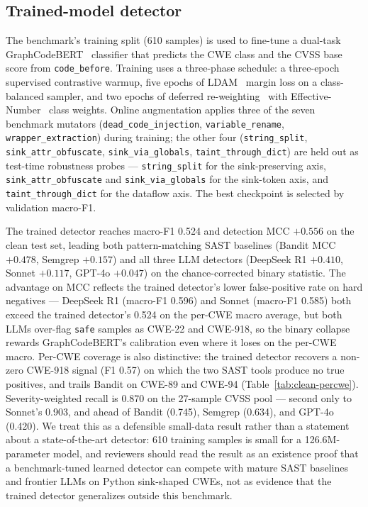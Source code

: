 \subsection{Trained-model detector}
\label{sec:eval:model}

The benchmark's training split (610 samples) is used to fine-tune a
dual-task GraphCodeBERT~\cite{graphcodebert} classifier that predicts
the CWE class and the CVSS base score from \texttt{code\_before}.
Training uses a three-phase schedule: a three-epoch supervised
contrastive warmup, five epochs of LDAM~\cite{cao2019ldam} margin
loss on a class-balanced sampler, and two epochs of deferred
re-weighting~\cite{cao2019ldam} with Effective-Number~\cite{cui2019cb}
class weights. Online augmentation applies three of the seven
benchmark mutators (\texttt{dead\_code\_injection},
\texttt{variable\_rename}, \texttt{wrapper\_extraction}) during
training; the other four (\texttt{string\_split},
\texttt{sink\_attr\_obfuscate}, \texttt{sink\_via\_globals},
\texttt{taint\_through\_dict}) are held out as test-time robustness
probes — \texttt{string\_split} for the sink-preserving axis,
\texttt{sink\_attr\_obfuscate} and \texttt{sink\_via\_globals} for
the sink-token axis, and \texttt{taint\_through\_dict} for the
dataflow axis. The best checkpoint is selected by validation
macro-F1.

The trained detector reaches macro-F1 0.524 and detection MCC
$+0.556$ on the clean test set, leading both pattern-matching SAST
baselines (Bandit MCC $+0.478$, Semgrep $+0.157$) and all three LLM
detectors (DeepSeek R1 $+0.410$, Sonnet $+0.117$, GPT-4o $+0.047$)
on the chance-corrected binary statistic. The advantage on MCC
reflects the trained detector's lower false-positive rate on hard
negatives — DeepSeek R1 (macro-F1 0.596) and Sonnet (macro-F1 0.585)
both exceed the trained detector's 0.524 on the per-CWE macro
average, but both LLMs over-flag \texttt{safe} samples as CWE-22 and
CWE-918, so the binary collapse rewards GraphCodeBERT's calibration
even where it loses on the per-CWE macro. Per-CWE coverage is also distinctive: the trained detector
recovers a non-zero CWE-918 signal (F1 0.57) on which the two SAST
tools produce no true positives, and trails Bandit on CWE-89 and
CWE-94 (Table~\ref{tab:clean-percwe}). Severity-weighted recall is
0.870 on the 27-sample CVSS pool — second only to Sonnet's 0.903,
and ahead of Bandit (0.745), Semgrep (0.634), and GPT-4o (0.420).
We treat this as a defensible small-data result rather than a
statement about a state-of-the-art detector: 610 training samples
is small for a 126.6M-parameter model, and reviewers should read
the result as an existence proof that a benchmark-tuned learned
detector can compete with mature SAST baselines and frontier LLMs
on Python sink-shaped CWEs, not as evidence that the trained
detector generalizes outside this benchmark.

